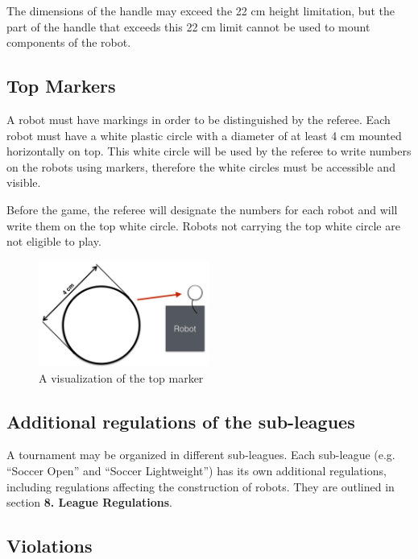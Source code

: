 \documentclass{article}
\begin{document}
The dimensions of the handle may exceed the 22 cm height limitation, but the
part of the handle that exceeds this 22 cm limit cannot be used to mount
components of the robot.

\subsection{ Top Markers\label{ref-top-markers}}

A robot must have markings in order to be distinguished by the referee. Each
robot must have a white plastic circle with a diameter of at least 4 cm mounted
horizontally on top. This white circle will be used by the referee to write
numbers on the robots using markers, therefore the white circles must be
accessible and visible.

Before the game, the referee will designate the numbers for each robot and will
write them on the top white circle. Robots not carrying the top white circle
are not eligible to play.

\begin{figure}[H]
    \centering
    \includegraphics[width=0.5\textwidth]{media/image4.jpeg}
    \caption{A visualization of the top marker}
    \label{fig:top_marker}
\end{figure}

\subsection{ Additional regulations of the sub-leagues \label{ref-sub-leagues}}

A tournament may be organized in different sub-leagues. Each sub-league (e.g.
``Soccer Open'' and ``Soccer Lightweight'') has its own additional regulations,
including regulations affecting the construction of robots. They are outlined
in section \textbf{8. League Regulations}.

\subsection{ Violations \label{ref-027}}
\end{document}
